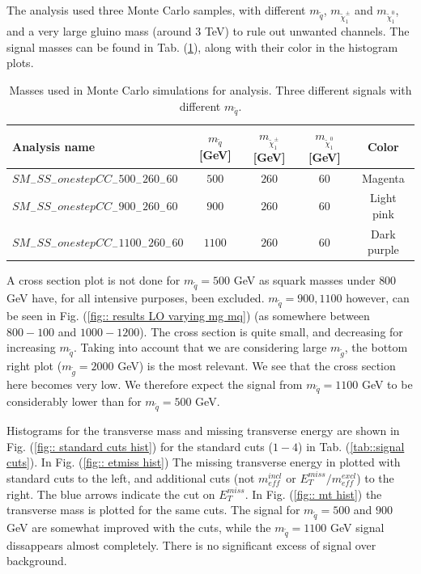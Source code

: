 \documentclass[11pt]{article}
\begin{document}
\begin{flushleft}
The analysis used three Monte Carlo samples, with different $m_{\tilde{q}}$, $m_{\tilde{\chi}_1^{\pm}}$ and $m_{\tilde{\chi}_1^0}$, and a very large gluino mass (around $3$ TeV) to rule out unwanted channels. The signal masses can be found in Tab. (\ref{tab:: signal masses}), along with their color in the histogram plots.
\end{flushleft}
\begin{table}[H]
\centering
\begin{tabular}{|l|c|c|c|c|}
\hline
Analysis name & $m_{\tilde{q}}$ [GeV] & $m_{\tilde{\chi}_1^{\pm}}$ [GeV] & $m_{\tilde{\chi}_1^0}$ [GeV] & Color\\
\hline
$SM_-SS_-onestepCC_-500_-260_-60$ &$500$ & $260$ & $60$ & Magenta\\ 
$SM_-SS_-onestepCC_-900_-260_-60$ &$900$ & $260$ & $60$ & Light pink\\ 
$SM_-SS_-onestepCC_-1100_-260_-60$ &$1100$ & $260$ & $60$ & Dark purple\\ 
\hline
\end{tabular}
\caption{Masses used in Monte Carlo simulations for analysis. Three different signals with different $m_{\tilde{q}}$.}
\label{tab:: signal masses}
\end{table}

\begin{flushleft}
A cross section plot is not done for $m_{\tilde{q}}=500$ GeV as squark masses under $800$ GeV have, for all intensive purposes, been excluded. $m_{\tilde{q}}=900,1100$ however, can be seen in Fig. (\ref{fig:: results LO varying mg mq}) (as somewhere between $800-100$ and $1000-1200$). The cross section is quite small, and decreasing for increasing $m_{\tilde{q}}$. Taking into account that we are considering large $m_{\tilde{g}}$, the bottom right plot ($m_{\tilde{g}}=2000$ GeV) is the most relevant. We see that the cross section here becomes very low. We therefore expect the signal from $m_{\tilde{q}}=1100$ GeV to be considerably lower than for $m_{\tilde{q}}=500$ GeV. 
\end{flushleft}

\begin{flushleft}
Histograms for the transverse mass and missing transverse energy are shown in Fig. (\ref{fig:: standard cuts hist}) for the standard cuts ($1-4$) in Tab. (\ref{tab::signal cuts}). In Fig. (\ref{fig:: etmiss hist}) The missing transverse energy in plotted with standard cuts to the left, and additional cuts (not $m_{eff}^{incl}$ or $E_T^{miss}/m_{eff}^{excl}$) to the right. The blue arrows indicate the cut on $E_T^{miss}$. In Fig. (\ref{fig:: mt hist}) the transverse mass is plotted for the same cuts. The signal for $m_{\tilde{q}}=500$ and $900$ GeV are somewhat improved with the cuts, while the $m_{\tilde{q}}=1100$ GeV signal dissappears almost completely. There is no significant excess of signal over background.
\end{flushleft}
\end{document}
